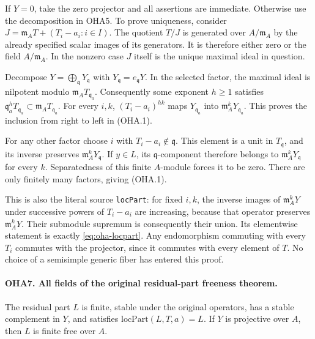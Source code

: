 \documentclass[11pt,a4paper]{article}
\numberwithin{equation}{section}
\theoremstyle{remark}\newtheorem{remark}[theorem]{Remark}
\begin{document}
If \(Y=0\), take the zero projector and all assertions are immediate.
Otherwise use the decomposition in OHA5. To prove uniqueness, consider
\(J=\mathfrak m_AT+(T_i-a_i:i\in I)\).
The quotient \(T/J\) is generated over \(A/\mathfrak m_A\)
by the already specified scalar images of its generators.
It is therefore either zero or the field \(A/\mathfrak m_A\).
In the nonzero case \(J\) itself is the unique maximal ideal
in question.

Decompose \(Y=\bigoplus_{\mathfrak q}Y_{\mathfrak q}\) with
\(Y_{\mathfrak q}=e_{\mathfrak q}Y\). In the selected factor,
the maximal ideal is nilpotent modulo \(\mathfrak m_AT_{\mathfrak q_a}\).
Consequently some exponent \(h\ge1\) satisfies
\(\mathfrak q_a^hT_{\mathfrak q_a}
 \subset\mathfrak m_AT_{\mathfrak q_a}\).
For every \(i,\allowbreak{} k\), \((T_i-a_i)^{hk}\) maps
\(Y_{\mathfrak q_a}\) into \(\mathfrak m_A^kY_{\mathfrak q_a}\).
This proves the inclusion from right to left in (OHA.1).

For any other factor choose \(i\) with \(T_i-a_i\notin\mathfrak q\).
This element is a unit in \(T_{\mathfrak q}\), and its inverse
preserves \(\mathfrak m_A^kY_{\mathfrak q}\).
If \(y\in L\), its \(\mathfrak q\)-component therefore belongs
to \(\mathfrak m_A^kY_{\mathfrak q}\) for every \(k\).
Separatedness of this finite \(A\)-module forces it to be zero.
There are only finitely many factors, giving (OHA.1).

This is also the literal source \texttt{loc\allowbreak Part}: for fixed
\(i,\allowbreak{} k\), the inverse images of \(\mathfrak m_A^kY\) under
successive powers of \(T_i-a_i\) are increasing, because
that operator preserves \(\mathfrak m_A^kY\). Their submodule
supremum is consequently their union. Its elementwise statement
is exactly \eqref{eq:oha-locpart}.
Any endomorphism commuting with every \(T_i\) commutes with
the projector, since it commutes with every element of \(T\).
No choice of a semisimple generic fiber has entered this proof.

\paragraph{OHA7. All fields of the original residual-part freeness theorem.}
\label{claim:OHA7}
The residual part \(L\) is finite, stable under the original
operators, has a stable complement in \(Y\), and satisfies
\(\mathrm{locPart}(L,\allowbreak{} T,\allowbreak{} a)=L\). If \(Y\) is projective over \(A\),
then \(L\) is finite free over \(A\).
\end{document}
